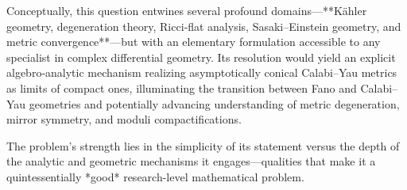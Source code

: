Conceptually, this question entwines several profound domains—**Kähler geometry, degeneration theory, Ricci‑flat analysis, Sasaki–Einstein geometry, and metric convergence**—but with an elementary formulation accessible to any specialist in complex differential geometry. Its resolution would yield an explicit algebro‑analytic mechanism realizing asymptotically conical Calabi–Yau metrics as limits of compact ones, illuminating the transition between Fano and Calabi–Yau geometries and potentially advancing understanding of metric degeneration, mirror symmetry, and moduli compactifications.

The problem’s strength lies in the simplicity of its statement versus the depth of the analytic and geometric mechanisms it engages—qualities that make it a quintessentially *good* research-level mathematical problem.